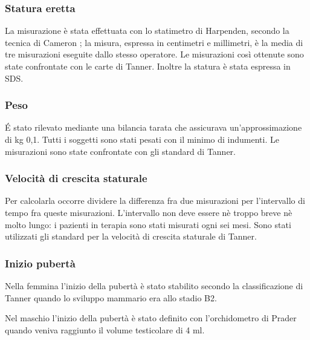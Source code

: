 \subsubsection*{Statura eretta}
 La misurazione è stata effettuata con lo statimetro di Harpenden, secondo la tecnica di Cameron\cite{cameron1984measurement}
; la misura, espressa in centimetri e millimetri, è la media di tre misurazioni eseguite dallo stesso operatore. Le misurazioni così ottenute sono state confrontate con le carte di Tanner\cite{tanner1966standards}.
Inoltre la statura è stata espressa in SDS.

  
\subsubsection*{Peso}
 \'E stato rilevato mediante una bilancia tarata che assicurava un'approssimazione di kg 0,1. Tutti i soggetti sono stati pesati con il minimo di indumenti. Le misurazioni sono state confrontate con gli standard di Tanner\cite{tanner1966standards}. 

\subsubsection*{Velocità di crescita staturale}
Per calcolarla occorre dividere la differenza fra due misurazioni per l'intervallo di tempo fra queste misurazioni. L'intervallo non deve essere nè troppo breve nè molto lungo: i pazienti in terapia sono stati misurati ogni sei mesi. Sono stati utilizzati gli standard per la velocità di crescita staturale di Tanner\cite{tanner1966standards}.

\subsubsection*{Inizio pubertà}
Nella femmina l'inizio della pubertà è stato stabilito secondo la classificazione di Tanner\cite{tanner1990foetus} quando lo sviluppo mammario era allo stadio B2.

Nel maschio l'inizio della pubertà è stato definito con l'orchidometro di Prader quando veniva raggiunto il volume testicolare di 4 ml.


